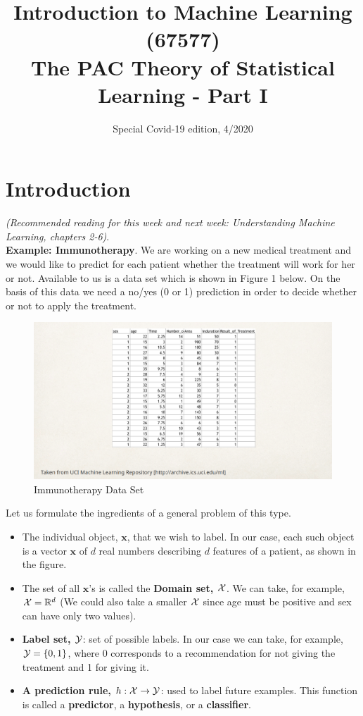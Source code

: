 \documentclass[11pt]{article}
\title{{\large{Introduction to Machine Learning (67577) \\
\vphantom{} The PAC Theory of Statistical Learning - Part I}}}
\date{Special Covid-19 edition, 4/2020}
\begin{document}
\maketitle

\tableofcontents
\pagebreak



\section{Introduction}

{\it(Recommended reading for this week and next week: Understanding Machine Learning, chapters 2-6)}.\\

\textbf{Example: Immunotherapy}. We are working on a new medical treatment and we would like to predict for each patient whether the treatment will work for her or not.
Available to us is a data set which is shown in Figure 1 below. On the basis of this data we need a no/yes (0 or 1) prediction in order to decide whether or not to apply the treatment.
\begin{figure}[h!]
  \centering
    \includegraphics[scale=0.3]{ImmunotherapyDataSet.png}
    \caption{Immunotherapy Data Set}
\end{figure}
Let us formulate the ingredients of a general problem of this type.

\begin{itemize}
 \item The individual object, $\mathbf{x}$, that we wish to label. In our case, each such object is a vector $\mathbf{x}$ of $d$ real numbers describing $d$ features of a patient, as shown in the figure.
 \item The set of all $\mathbf{x}$'s is called the \textbf{Domain set, $\mathcal{X}$}. We can take, for example,  $\mathcal{X}= \mathbb{R}^d$ (We could also take a smaller $\mathcal{X}$ since age must be positive and sex can have only two values).
 \item \textbf{Label set, $\mathcal{Y}$}: set of possible labels. In our case we can take, for example,  $\mathcal{Y}=\{0,1\}$, where $0$ corresponds to a recommendation for not giving the treatment and 1 for giving it.
 \item \textbf{A prediction rule, $h:\mathcal{X}\to \mathcal{Y}$}: used to label future examples. This function is called a \textbf{predictor}, a \textbf{hypothesis}, or a  \textbf{classifier}.
\end{itemize}
\end{document}
